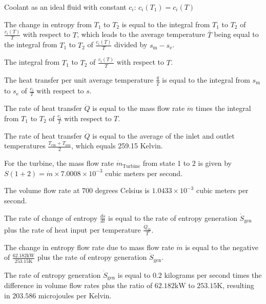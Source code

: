 Coolant as an ideal fluid with constant \( c_i \): \( c_i(T_1) = c_i(T) \)

The change in entropy from \( T_1 \) to \( T_2 \) is equal to the integral from \( T_1 \) to \( T_2 \) of \( \frac{c_i(T)}{T} \) with respect to \( T \), which leads to the average temperature \( \bar{T} \) being equal to the integral from \( T_1 \) to \( T_2 \) of \( \frac{c_i(T)}{T} \) divided by \( s_{\text{m}} - s_{\text{e}} \).

The integral from \( T_1 \) to \( T_2 \) of \( \frac{c_i(T)}{T} \) with respect to \( T \).

The heat transfer per unit average temperature \( \frac{q}{\bar{T}} \) is equal to the integral from \( s_{\text{m}} \) to \( s_{\text{e}} \) of \( \frac{c_i}{T} \) with respect to \( s \).

The rate of heat transfer \( \dot{Q} \) is equal to the mass flow rate \( \dot{m} \) times the integral from \( T_1 \) to \( T_2 \) of \( \frac{c_i}{T} \) with respect to \( T \).

The rate of heat transfer \( \dot{Q} \) is equal to the average of the inlet and outlet temperatures \( \frac{T_{\text{ein}} + T_{\text{aus}}}{2} \), which equals 259.15 Kelvin.

For the turbine, the mass flow rate \( \dot{m}_{\text{Turbine}} \) from state 1 to 2 is given by \( S(1+2) = \dot{m} \times 7.0008 \times 10^{-3} \) cubic meters per second.

The volume flow rate at \( 700 \) degrees Celsius is \( 1.0433 \times 10^{-3} \) cubic meters per second.

The rate of change of entropy \( \frac{ds}{dt} \) is equal to the rate of entropy generation \( \dot{S}_{\text{gen}} \) plus the rate of heat input per temperature \( \frac{\dot{Q}_{\text{in}}}{T} \).

The change in entropy flow rate due to mass flow rate \( \dot{m} \) is equal to the negative of \( \frac{62.182 \text{kW}}{253.15 \text{K}} \) plus the rate of entropy generation \( \dot{S}_{\text{gen}} \).

The rate of entropy generation \( \dot{S}_{\text{gen}} \) is equal to \( 0.2 \) kilograms per second times the difference in volume flow rates plus the ratio of \( 62.182 \text{kW} \) to \( 253.15 \text{K} \), resulting in \( 203.586 \) microjoules per Kelvin.